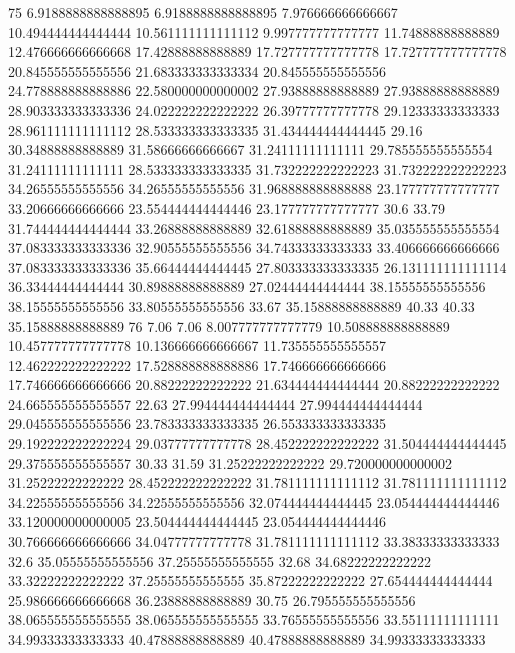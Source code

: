 75 6.9188888888888895 6.9188888888888895 7.976666666666667 10.494444444444444 10.561111111111112 9.997777777777777 11.74888888888889 12.476666666666668 17.42888888888889 17.727777777777778 17.727777777777778 20.845555555555556 21.683333333333334 20.845555555555556 24.778888888888886 22.580000000000002 27.93888888888889 27.93888888888889 28.903333333333336 24.022222222222222 26.39777777777778 29.12333333333333 28.961111111111112 28.533333333333335 31.434444444444445 29.16 30.34888888888889 31.58666666666667 31.24111111111111 29.785555555555554 31.24111111111111 28.533333333333335 31.732222222222223 31.732222222222223 34.26555555555556 34.26555555555556 31.968888888888888 23.177777777777777 33.20666666666666 23.554444444444446 23.177777777777777 30.6 33.79 31.744444444444444 33.26888888888889 32.61888888888889 35.035555555555554 37.083333333333336 32.90555555555556 34.74333333333333 33.406666666666666 37.083333333333336 35.66444444444445 27.803333333333335 26.131111111111114 36.33444444444444 30.89888888888889 27.02444444444444 38.15555555555556 38.15555555555556 33.80555555555556 33.67 35.15888888888889 40.33 40.33 35.15888888888889
76 7.06 7.06 8.007777777777779 10.508888888888889 10.457777777777778 10.136666666666667 11.735555555555557 12.462222222222222 17.528888888888886 17.746666666666666 17.746666666666666 20.88222222222222 21.634444444444444 20.88222222222222 24.665555555555557 22.63 27.994444444444444 27.994444444444444 29.045555555555556 23.783333333333335 26.553333333333335 29.192222222222224 29.03777777777778 28.452222222222222 31.504444444444445 29.375555555555557 30.33 31.59 31.25222222222222 29.720000000000002 31.25222222222222 28.452222222222222 31.781111111111112 31.781111111111112 34.22555555555556 34.22555555555556 32.074444444444445 23.054444444444446 33.120000000000005 23.504444444444445 23.054444444444446 30.766666666666666 34.04777777777778 31.781111111111112 33.38333333333333 32.6 35.05555555555556 37.25555555555555 32.68 34.68222222222222 33.32222222222222 37.25555555555555 35.87222222222222 27.654444444444444 25.986666666666668 36.23888888888889 30.75 26.795555555555556 38.065555555555555 38.065555555555555 33.76555555555556 33.55111111111111 34.99333333333333 40.47888888888889 40.47888888888889 34.99333333333333
